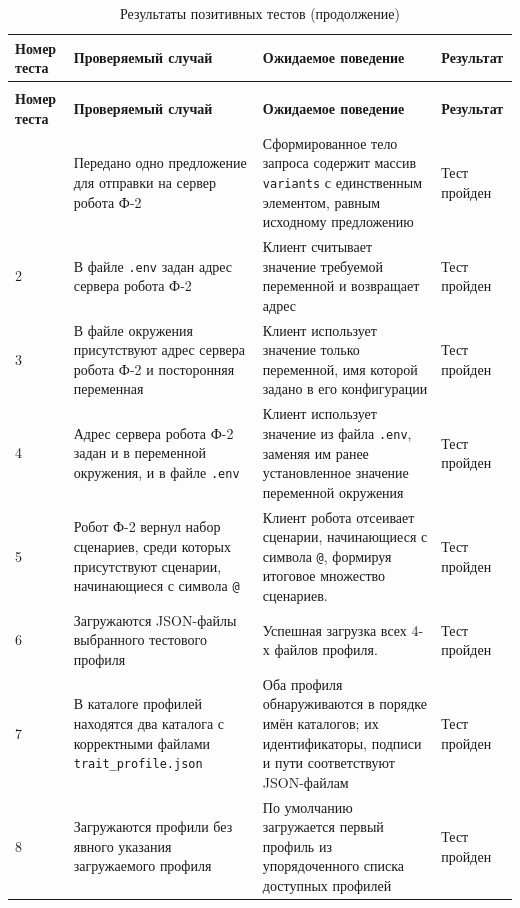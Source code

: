 \begin{longtable}{|p{}|p{}|p{}|p{}|}
	\caption{Результаты позитивных тестов}
	\label{tbl:functional_test_results} \\
	\hline
	\textbf{Номер теста} & \textbf{Проверяемый случай} & \textbf{Ожидаемое поведение} & \textbf{Результат} \\
	\hline
	\endfirsthead
	\caption[]{Результаты позитивных тестов (продолжение)} \\
	\hline
	\textbf{Номер теста} & \textbf{Проверяемый случай} & \textbf{Ожидаемое поведение} & \textbf{Результат} \\
	\hline
	\endhead
	\hline
	\endfoot
	\endlastfoot
	1 & Передано одно предложение для отправки на сервер робота Ф-2 &
	Сформированное тело запроса содержит массив \texttt{variants} с
	единственным элементом, равным исходному предложению & Тест пройден \\
	\hline
	2 & В файле \texttt{.env} задан адрес сервера робота Ф-2 & Клиент считывает
	значение требуемой переменной и возвращает адрес &
	Тест пройден \\
	\hline
	3 & В файле окружения присутствуют адрес сервера робота Ф-2 и посторонняя
	переменная & Клиент использует значение только переменной, имя которой
	задано в его конфигурации & Тест пройден \\
	\hline
	4 & Адрес сервера робота Ф-2 задан и в переменной окружения, и в файле
	\texttt{.env} & Клиент использует значение из файла \texttt{.env},
	заменяя им ранее установленное значение переменной окружения &
	Тест пройден \\
	\hline
	5 & Робот Ф-2 вернул набор сценариев, среди которых присутствуют сценарии,
	начинающиеся с символа \texttt{@} & Клиент робота отсеивает сценарии,
	начинающиеся с символа \texttt{@}, формируя итоговое множество
	сценариев. & Тест пройден \\
	\hline
	6 & Загружаются JSON-файлы выбранного тестового
	профиля & Успешная загрузка всех 4-х файлов профиля. & Тест пройден \\
	\hline
	7 & В каталоге профилей находятся два каталога с корректными
	файлами \texttt{trait\_profile.json} & Оба профиля обнаруживаются в
	порядке имён каталогов; их идентификаторы, подписи и пути соответствуют
	JSON-файлам & Тест пройден \\
	\hline
	8 & Загружаются профили без явного указания загружаемого профиля & По умолчанию загружается первый профиль из упорядоченного
	списка доступных профилей & Тест пройден \\

\end{longtable}
